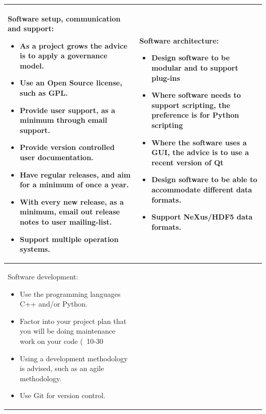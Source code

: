 \documentclass[jnr]{iosart2x}
\begin{document}
\begin{tabular}{l|l}
\hline
  \begin{minipage}[t]{0.4\textwidth}
    Software setup, communication and support:
    \begin{itemize}
      \item As a project grows the advice is to apply a governance model.
      \item Use an Open Source license, such as GPL.
      \item Provide user support, as a minimum through email support.
      \item Provide version controlled user documentation.
      \item Have regular releases, and aim for a minimum of once a year.
      \item With every new release, as a minimum, email out release notes to user mailing-list.
      \item Support multiple operation systems.
    \end{itemize}
  \end{minipage} & 
  \begin{minipage}[t]{0.4\textwidth}
    Software architecture:
    \begin{itemize}
      \item Design software to be modular and to support plug-ins
      \item Where software needs to support scripting, the preference is for Python scripting
      \item Where the software uses a GUI, the advice is to use a recent version of Qt
      \item Design software to be able to accommodate different data formats.
      \item Support NeXus/HDF5 data formats.
    \end{itemize}
  \end{minipage}  \\
  \hline
  \begin{minipage}[t]{0.4\textwidth}
    Software development:
    \begin{itemize}
      \item Use the programming languages C++ and/or Python.
      \item Factor into your project plan that you will be doing maintenance work on your code (~10-30%
      \item Using a development methodology is advised, such as an agile methodology.
      \item Use Git for version control.

\end{itemize}
\end{minipage}
\end{tabular}
\end{document}
